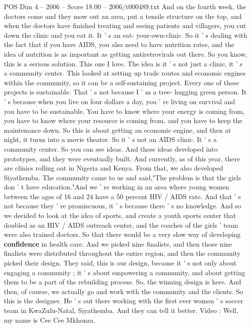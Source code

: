 \begin{textsample}{POS Dim 4 – 2006 – Score 18.00 – 2006/t000489.txt}
And on the fourth week, the doctors come and they mow out an area, put a tensile structure on the top, and when the doctors have finished treating and seeing patients and villagers, you cut down the clinic and you eat it.
It ' s an eat- your-own-clinic.
So it ' s dealing with the fact that if you have AIDS, you also need to have nutrition rates, and the idea of nutrition is as important as getting antiretrovirals out there.
So you know, this is a serious solution.
This one I love.
The idea is it ' s not just a clinic, it ' s a community center.
This looked at setting up trade routes and economic engines within the community, so it can be a self-sustaining project.
Every one of these projects is sustainable.
That ' s not because I ' m a tree- hugging green person.
It ' s because when you live on four dollars a day, you ' re living on survival and you have to be sustainable.
You have to know where your energy is coming from, you have to know where your resource is coming from, and you have to keep the maintenance down.
So this is about getting an economic engine, and then at night, it turns into a movie theater.
So it ' s not an AIDS clinic.
It ' s a community center.
So you can see ideas.
And these ideas developed into prototypes, and they were eventually built.
And currently, as of this year, there are clinics rolling out in Nigeria and Kenya.
From that, we also developed Siyathemba.
The community came to us and said,"The problem is that the girls don ' t have education."And we ' re working in an area where young women between the ages of 16 and 24 have a 50 percent HIV / AIDS rate.
And that ' s not because they ' re promiscuous, it ' s because there ' s no knowledge.
And so we decided to look at the idea of sports, and create a youth sports center that doubled as an HIV / AIDS outreach center, and the coaches of the girls ' team were also trained doctors.
So that there would be a very slow way of developing \textbf{confidence} in health care.
And we picked nine finalists, and then those nine finalists were distributed throughout the entire region, and then the community picked their design.
They said, this is our design, because it ' s not only about engaging a community ; it ' s about empowering a community, and about getting them to be a part of the rebuilding process.
So, the winning design is here.
And then, of course, we actually go and work with the community and the clients.
So this is the designer.
He ' s out there working with the first ever women ' s soccer team in KwaZulu-Natal, Siyathemba.
And they can tell it better.
Video : Well, my name is Cee Cee Mkhonza.

\end{textsample}
